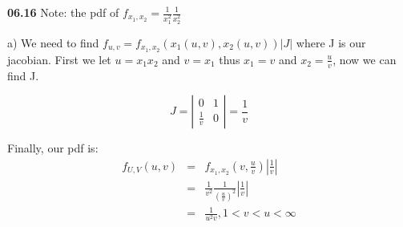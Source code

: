 {\bf 06.16} \quad Note: the pdf of $f_{x_1,x_2} = \frac{1}{x_{1}^{2}}\frac{1}{x_{2}^{2}}$

a) We need to find $f_{u,v} = f_{x_1,x_2} (x_1(u,v),x_2(u,v)) \vert J \vert$ where J is our jacobian. First we let $u = x_1 x_2$ and $v = x_1$ thus $x_1 = v$ and $x_2 = \frac{u}{v}$, now we can find J.

\[ J = \left| \begin{array}{cc}
0 & 1 \\
\frac{1}{v} & 0 \end{array} \right| = \frac{1}{v} \]

Finally, our pdf is:
\begin{eqnarray*}
f_{U,V}(u,v) &=& f_{x_1,x_2}(v,\frac{u}{v})\left| \frac{1}{v} \right| \\
 &=& \frac{1}{v^2}\frac{1}{(\frac{u}{v})^2}\left| \frac{1}{v} \right| \\
&=& \frac{1}{u^2v} , 1 < v < u <\infty
\end{eqnarray*}
